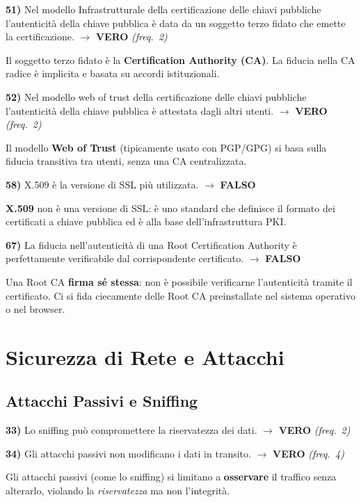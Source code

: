\documentclass[12pt, a4paper]{report}
\newcommand{\vero}{\textcolor{verdeanswer}{\textbf{VERO}}}
\newcommand{\falso}{\textcolor{rossoanswer}{\textbf{FALSO}}}
\newcommand{\freq}[1]{\textcolor{freqcolor}{\textit{(freq.\ #1)}}}
\begin{document}
\noindent\textbf{51)} Nel modello Infrastrutturale della certificazione delle chiavi pubbliche l'autenticità della chiave pubblica è data da un soggetto terzo fidato che emette la certificazione. $\to$ \vero{} \freq{2}

\medskip
\noindent Il soggetto terzo fidato è la \textbf{Certification Authority (CA)}. La fiducia nella CA radice è implicita e basata su accordi istituzionali.

\medskip
\noindent\textbf{52)} Nel modello web of trust della certificazione delle chiavi pubbliche l'autenticità della chiave pubblica è attestata dagli altri utenti. $\to$ \vero{} \freq{2}

\medskip
\noindent Il modello \textbf{Web of Trust} (tipicamente usato con PGP/GPG) si basa sulla fiducia transitiva tra utenti, senza una CA centralizzata.

\medskip
\noindent\textbf{58)} X.509 è la versione di SSL più utilizzata. $\to$ \falso{}

\medskip
\noindent \textbf{X.509} non è una versione di SSL: è uno standard che definisce il formato dei certificati a chiave pubblica ed è alla base dell'infrastruttura PKI.

\medskip
\noindent\textbf{67)} La fiducia nell'autenticità di una Root Certification Authority è perfettamente verificabile dal corrispondente certificato. $\to$ \falso{}

\medskip
\noindent Una Root CA \textbf{firma sé stessa}: non è possibile verificarne l'autenticità tramite il certificato. Ci si fida ciecamente delle Root CA preinstallate nel sistema operativo o nel browser.

\chapter{Sicurezza di Rete e Attacchi}

\section{Attacchi Passivi e Sniffing}

\noindent\textbf{33)} Lo sniffing può compromettere la riservatezza dei dati. $\to$ \vero{} \freq{2}

\medskip
\noindent\textbf{34)} Gli attacchi passivi non modificano i dati in transito. $\to$ \vero{} \freq{4}

\medskip
\noindent Gli attacchi passivi (come lo sniffing) si limitano a \textbf{osservare} il traffico senza alterarlo, violando la \textit{riservatezza} ma non l'integrità.
\end{document}

